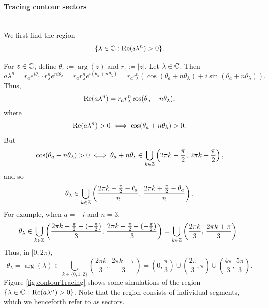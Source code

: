 \documentclass[11pt, oneside, a4paper]{article}
\begin{document}
\paragraph{Tracing contour sectors}\mbox{}\label{par:tracing_contour_sectors}\\
We first find the region
\[\{\lambda\in\mathbb C: \mathrm{Re}(a\lambda^n)>0\}.\]

For $z\in\mathbb C$, define $\theta_z:=\arg(z)$ and $r_z:=|z|$.
Let $\lambda\in\mathbb C$. Then
\[a\lambda^n = r_ae^{i\theta_a}\cdot r_\lambda^n e^{ni\theta_\lambda} = r_a r_\lambda^n e^{i(\theta_a+n\theta_\lambda)} = r_ar_\lambda^n(\cos(\theta_a+n\theta_\lambda) + i\sin(\theta_a+n\theta_\lambda)).\]
Thus,
\[\mathrm{Re}(a\lambda^n) = r_ar_\lambda^n \cos(\theta_a+n\theta_\lambda),\]
where
\[\mathrm{Re}(a\lambda^n)>0 \iff \cos(\theta_a+n\theta_\lambda)>0.\]
But
\[\cos(\theta_a+n\theta_\lambda)>0 \iff \theta_a+n\theta_\lambda\in \bigcup_{k\in\mathbb Z}\left(2\pi k -\frac{\pi}{2},\,2\pi k + \frac{\pi}{2}\right),\]
and so
\[\theta_\lambda\in \bigcup_{k\in\mathbb Z}\left(\frac{2\pi k -\frac{\pi}{2}-\theta_a}{n},\,\frac{2\pi k + \frac{\pi}{2}-\theta_a}{n}\right).\]
For example, when $a=-i$ and $n=3$,
\[\theta_\lambda\in \bigcup_{k\in\mathbb Z}\left(\frac{2\pi k -\frac{\pi}{2}-(-\frac{\pi}{2})}{3},\,\frac{2\pi k + \frac{\pi}{2}-(-\frac{\pi}{2})}{3}\right) = \bigcup_{k\in\mathbb Z}\left(\frac{2\pi k}{3},\,\frac{2\pi k + \pi}{3}\right).\]
Thus, in $[0,2\pi)$,
\[\theta_\lambda=\arg(\lambda)\in \bigcup_{k\in\{0,1,2\}}\left(\frac{2\pi k}{3},\,\frac{2\pi k + \pi}{3}\right) = \left(0,\frac{\pi}{3}\right)\cup \left(\frac{2\pi}{3}, \pi\right)\cup \left(\frac{4\pi}{3}, \frac{5\pi}{3}\right).\]
Figure \ref{fig:contourTracing} shows some simulations of the region $\{\lambda\in\mathbb C:\,\mathrm{Re}(a\lambda^n)>0\}$. Note that the region consists of individual segments, which we henceforth refer to as sectors.
\end{document}
